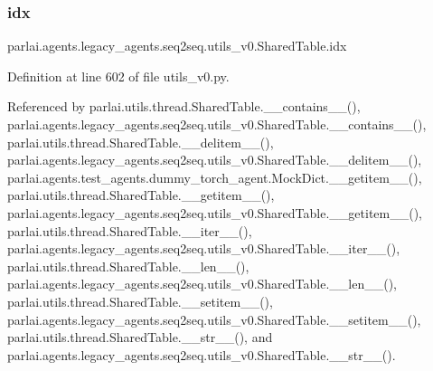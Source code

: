 \subsubsection{\texorpdfstring{idx}{idx}}
{\footnotesize\ttfamily parlai.\+agents.\+legacy\+\_\+agents.\+seq2seq.\+utils\+\_\+v0.\+Shared\+Table.\+idx}



Definition at line 602 of file utils\+\_\+v0.\+py.



Referenced by parlai.\+utils.\+thread.\+Shared\+Table.\+\_\+\+\_\+contains\+\_\+\+\_\+(), parlai.\+agents.\+legacy\+\_\+agents.\+seq2seq.\+utils\+\_\+v0.\+Shared\+Table.\+\_\+\+\_\+contains\+\_\+\+\_\+(), parlai.\+utils.\+thread.\+Shared\+Table.\+\_\+\+\_\+delitem\+\_\+\+\_\+(), parlai.\+agents.\+legacy\+\_\+agents.\+seq2seq.\+utils\+\_\+v0.\+Shared\+Table.\+\_\+\+\_\+delitem\+\_\+\+\_\+(), parlai.\+agents.\+test\+\_\+agents.\+dummy\+\_\+torch\+\_\+agent.\+Mock\+Dict.\+\_\+\+\_\+getitem\+\_\+\+\_\+(), parlai.\+utils.\+thread.\+Shared\+Table.\+\_\+\+\_\+getitem\+\_\+\+\_\+(), parlai.\+agents.\+legacy\+\_\+agents.\+seq2seq.\+utils\+\_\+v0.\+Shared\+Table.\+\_\+\+\_\+getitem\+\_\+\+\_\+(), parlai.\+utils.\+thread.\+Shared\+Table.\+\_\+\+\_\+iter\+\_\+\+\_\+(), parlai.\+agents.\+legacy\+\_\+agents.\+seq2seq.\+utils\+\_\+v0.\+Shared\+Table.\+\_\+\+\_\+iter\+\_\+\+\_\+(), parlai.\+utils.\+thread.\+Shared\+Table.\+\_\+\+\_\+len\+\_\+\+\_\+(), parlai.\+agents.\+legacy\+\_\+agents.\+seq2seq.\+utils\+\_\+v0.\+Shared\+Table.\+\_\+\+\_\+len\+\_\+\+\_\+(), parlai.\+utils.\+thread.\+Shared\+Table.\+\_\+\+\_\+setitem\+\_\+\+\_\+(), parlai.\+agents.\+legacy\+\_\+agents.\+seq2seq.\+utils\+\_\+v0.\+Shared\+Table.\+\_\+\+\_\+setitem\+\_\+\+\_\+(), parlai.\+utils.\+thread.\+Shared\+Table.\+\_\+\+\_\+str\+\_\+\+\_\+(), and parlai.\+agents.\+legacy\+\_\+agents.\+seq2seq.\+utils\+\_\+v0.\+Shared\+Table.\+\_\+\+\_\+str\+\_\+\+\_\+().

\mbox{\label{classparlai_1_1agents_1_1legacy__agents_1_1seq2seq_1_1utils__v0_1_1SharedTable_acd92e05b572beb74c384c3c6b833dac6}} 
